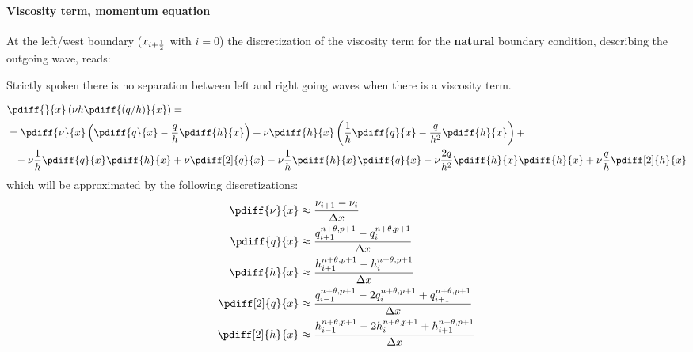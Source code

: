\paragraph*{Viscosity term, momentum equation}
At the left/west boundary ($x_{i+\frac{1}{2}}$ with $i=0$) the discretization of the viscosity term for the \textbf{natural} boundary condition, describing the outgoing wave, reads:
%
\begin{Remark}
    \item Strictly spoken there is no separation between left and right going waves when there is a viscosity term.
\end{Remark}
\begin{align}
&\pdiff{}{x}\left(\nu h \pdiff{(q/h)}{x}\right) =
\\
& = \pdiff{\nu}{x} \left(\pdiff{q}{x} - \frac{q}{h}\pdiff{h}{x}\right) +
\nu \pdiff{h}{x} \left( \frac{1}{h} \pdiff{q}{x} - \frac{q}{h^2}\pdiff{h}{x} \right) +
\nonumber \\*
& \phantom{=}
- \nu \frac{1}{h}  \pdiff{q}{x} \pdiff{h}{x} +\nu \pdiff[2]{q}{x}
-  \nu \frac{1}{h} \pdiff{h}{x}\pdiff{q}{x} -
\nu \frac{2q}{h^2} \pdiff{h}{x}\pdiff{h}{x}
+
\nu \frac{q}{h} \pdiff[2]{h}{x}
\end{align}
which will be approximated by the following discretizations:
\begin{align}
    \pdiff{\nu}{x} & \approx \frac{\nu_{i+1} - \nu_{i}}{\Dx}
    \\
    \pdiff{q}{x} & \approx \frac{q^{n+\theta,p+1}_{i+1} - q^{n+\theta, p+1}_{i}}{\Dx}
    \\
    \pdiff{h}{x} & \approx \frac{h^{n+\theta,p+1}_{i+1} - h^{n+\theta, p+1}_{i}}{\Dx}
    \\
    \pdiff[2]{q}{x} & \approx \frac{q^{n+\theta,p+1}_{i-1} - 2 q^{n+\theta, p+1}_{i} + q^{n+\theta, p+1}_{i+1}}{\Dx}
    \\
    \pdiff[2]{h}{x} & \approx \frac{h^{n+\theta,p+1}_{i-1} - 2 h^{n+\theta, p+1}_{i} + h^{n+\theta, p+1}_{i+1}}{\Dx}
\end{align}
